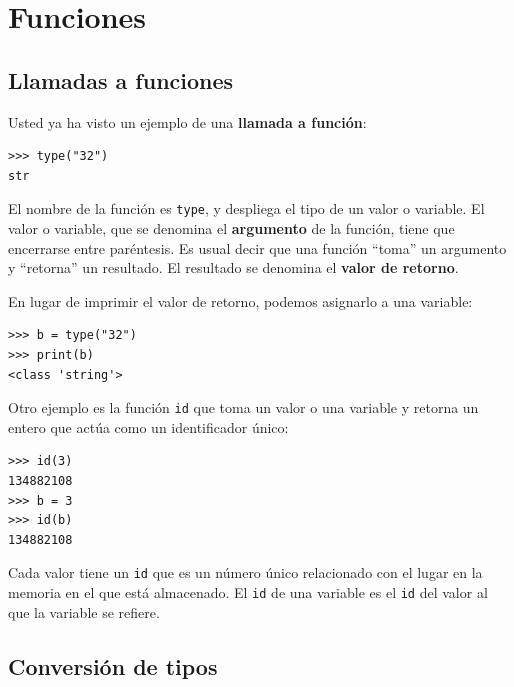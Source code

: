 
\chapter{Funciones }

\label{floatchap}

\section{Llamadas a funciones}

\label{functionchap}  

Usted ya ha visto un ejemplo de una \textbf{llamada a función}:

\begin{lstlisting}
>>> type("32")
str
\end{lstlisting}
El nombre de la función es \texttt{type}, y despliega el tipo de un
valor o variable. El valor o variable, que se denomina el \textbf{argumento}
de la función, tiene que encerrarse entre paréntesis. Es usual decir
que una función ``toma'' un argumento y ``retorna'' un resultado.
El resultado se denomina el \textbf{valor de retorno}.

 

En lugar de imprimir el valor de retorno, podemos asignarlo a una
variable:

\begin{lstlisting}
>>> b = type("32")
>>> print(b)
<class 'string'>
\end{lstlisting}

Otro ejemplo es la función \texttt{id} que toma un valor o una variable
y retorna un entero que actúa como un identificador único:

\begin{lstlisting}
>>> id(3)
134882108
>>> b = 3
>>> id(b)
134882108
\end{lstlisting}
 Cada valor tiene un \texttt{id} que es un número único relacionado
con el lugar en la memoria en el que está almacenado. El \texttt{id}
de una variable es el \texttt{id} del valor al que la variable se
refiere.

\section{Conversión de tipos}


